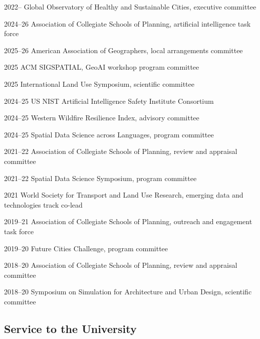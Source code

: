\documentclass[11pt,letterpaper]{report} %
\begin{document}
\begin{tablist}

\item[2022--]   \tab{}Global Observatory of Healthy and Sustainable Cities, executive committee
\item[2024--26] \tab{}Association of Collegiate Schools of Planning, artificial intelligence task force
\item[2025--26] \tab{}American Association of Geographers, local arrangements committee
\item[2025]     \tab{}ACM SIGSPATIAL, GeoAI workshop program committee
\item[2025]     \tab{}International Land Use Symposium, scientific committee
\item[2024--25] \tab{}US NIST Artificial Intelligence Safety Institute Consortium
\item[2024--25] \tab{}Western Wildfire Resilience Index, advisory committee
\item[2024--25] \tab{}Spatial Data Science across Languages, program committee
\item[2021--22] \tab{}Association of Collegiate Schools of Planning, review and appraisal committee
\item[2021--22] \tab{}Spatial Data Science Symposium, program committee
\item[2021]     \tab{}World Society for Transport and Land Use Research, emerging data and technologies track co-lead
\item[2019--21] \tab{}Association of Collegiate Schools of Planning, outreach and engagement task force
\item[2019--20] \tab{}Future Cities Challenge, program committee
\item[2018--20] \tab{}Association of Collegiate Schools of Planning, review and appraisal committee
\item[2018--20] \tab{}Symposium on Simulation for Architecture and Urban Design, scientific committee

\end{tablist}

\subsection*{Service to the University}
\end{document}
